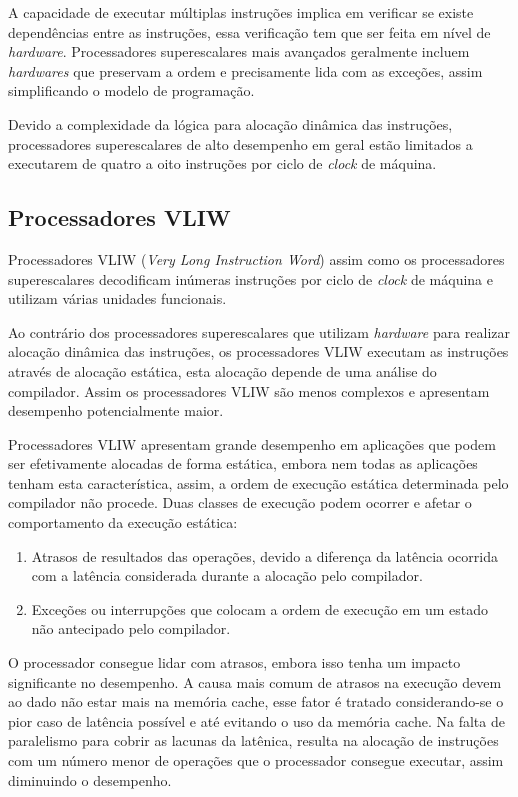 A capacidade de executar múltiplas instruções implica em verificar se existe
dependências entre as instruções, essa verificação tem que ser feita em nível de
\textit{hardware}. 
Processadores superescalares mais avançados geralmente incluem 
\textit{hardwares} que preservam a ordem e precisamente lida com as exceções, 
assim simplificando o modelo de programação.

Devido a complexidade da lógica para alocação dinâmica das instruções,
processadores superescalares de alto desempenho em geral estão limitados a
executarem de quatro a oito instruções por ciclo de \textit{clock} de máquina.


\subsection{Processadores VLIW}

Processadores VLIW (\textit{Very Long Instruction Word}) assim como os
processadores superescalares decodificam inúmeras instruções por ciclo de
\textit{clock} de máquina e utilizam várias unidades funcionais.

Ao contrário dos processadores superescalares que utilizam \textit{hardware}
para realizar alocação dinâmica das instruções, os processadores VLIW executam as 
instruções através de alocação estática, esta alocação depende de uma análise do
compilador.
Assim os processadores VLIW são menos complexos e apresentam desempenho 
potencialmente maior.

Processadores VLIW apresentam grande desempenho em aplicações que podem ser 
efetivamente alocadas de forma estática, embora nem todas as aplicações
tenham esta característica, assim, a ordem de execução estática determinada pelo
compilador não procede. 
Duas classes de execução podem ocorrer e afetar o comportamento da execução 
estática:

\begin{enumerate}
        \item Atrasos de resultados das operações, devido a diferença da latência
                ocorrida com a latência considerada durante a alocação pelo
                compilador.
        \item Exceções ou interrupções que colocam a ordem de execução em um
                estado não antecipado pelo compilador.
\end{enumerate}

O processador consegue lidar com atrasos, embora isso tenha um impacto 
significante no desempenho. 
A causa mais comum de atrasos na execução devem ao dado não estar mais na 
memória cache, esse fator é tratado considerando-se o pior caso de latência 
possível e até evitando o uso da memória cache. 
Na falta de paralelismo para cobrir as lacunas da latênica, resulta na 
alocação de instruções com um número menor de operações que o processador 
consegue executar, assim diminuindo o desempenho.


